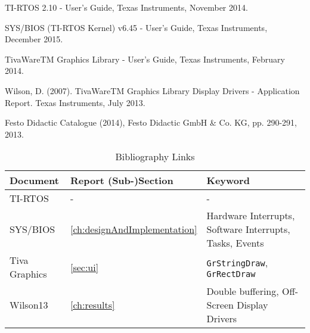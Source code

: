 \begin{thebibliography}{9}

TI-RTOS 2.10 - User's Guide, Texas Instruments, November 2014.

SYS/BIOS (TI-RTOS Kernel) v6.45 - User's Guide, Texas Instruments, December 2015.

TivaWareTM Graphics Library - User's Guide, Texas Instruments, February 2014.

Wilson, D. (2007). TivaWareTM Graphics Library Display Drivers - Application Report. Texas 
Instruments, July 2013.

Festo Didactic Catalogue (2014), Festo Didactic GmbH \& Co. KG, pp. 290-291, 2013.
 
\end{thebibliography}

\begin{table}[H]
	\begin{tabu} spread \linewidth {l | l | X[m]}
		\textbf{Document} & \textbf{Report (Sub-)Section} & \textbf{Keyword} \\
		\hline
		\hline
		TI-RTOS & - & -\\
		\hline
		SYS/BIOS & \ref{ch:designAndImplementation} & Hardware Interrupts, Software Interrupts, Tasks, Events\\
		\hline
		Tiva Graphics & \ref{sec:ui} & \texttt{GrStringDraw}, \texttt{GrRectDraw}\\
		\hline
		Wilson13 & \ref{ch:results} & Double buffering, Off-Screen Display Drivers\\	
	\end{tabu}
	\caption{Bibliography Links}
	\label{tab:BibliographyLinks}
\end{table}


